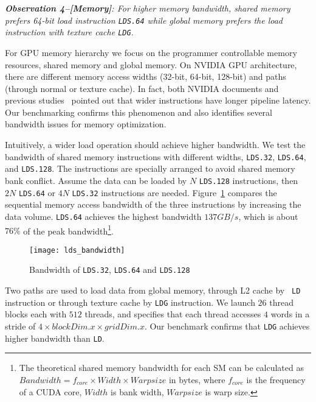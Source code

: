 {\em {\bf Observation 4--[Memory]}: For higher memory bandwidth, shared memory prefers 64-bit load 
instruction {\tt LDS.64} while global memory prefers the load instruction with texture cache {\tt LDG}.}

For GPU memory hierarchy we focus on the programmer controllable memory resources, shared memory and global memory. 
On NVIDIA GPU architecture, there are different memory access widths (32-bit, 64-bit, 128-bit) and paths (through normal or texture cache). 
In fact, both NVIDIA documents and previous studies~\cite{tan} pointed out that wider 
instructions have longer pipeline latency.
Our benchmarking confirms this phenomenon and also identifies several bandwidth issues for memory optimization.


Intuitively, a wider load operation should achieve higher bandwidth. 
We test the bandwidth of shared memory instructions with different widths, {\tt LDS.32}, {\tt LDS.64},
and {\tt LDS.128}. 
The instructions are specially arranged to avoid shared memory bank conflict. 
Assume the data can be loaded by $N$ {\tt LDS.128} instructions, 
then $2N$ {\tt LDS.64} or $4N$ {\tt LDS.32} instructions are needed.
Figure~\ref{fig:lds_bw} compares the sequential memory access bandwidth of the three instructions by increasing the data volume. 
{\tt LDS.64} achieves the highest bandwidth $137GB/s$, which is about $76\%$ of the peak bandwidth\footnote{The 
theoretical shared memory bandwidth for each SM can be calculated as $Bandwidth = f_{core} \times Width \times Warpsize$ in
bytes, where $f_{core}$ is the frequency of a CUDA core, $Width$ is bank width, $Warpsize$ is warp size.}.

\begin{figure}[htbp]
\begin{center}
\texttt{[image: lds\_bandwidth]}
    \caption{ Bandwidth of {\tt LDS.32}, {\tt LDS.64} and {\tt LDS.128}}
\label{fig:lds_bw}
\end{center}
\end{figure}

Two paths are used to load data from global memory, through L2 cache by {\tt
LD} instruction or through texture cache by {\tt LDG} instruction. 
We launch $26$ thread blocks each with $512$ threads, and specifies that each thread accesses $4$ words in a stride of $4 \times blockDim.x \times gridDim.x$. 
Our benchmark confirms that {\tt LDG} achieves higher bandwidth than {\tt LD}.

